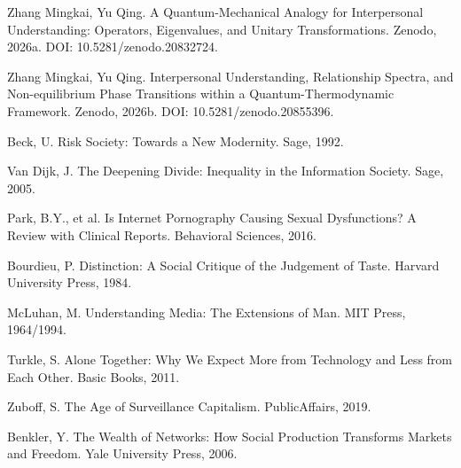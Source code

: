 ﻿\documentclass[12pt,a4paper]{article}
\begin{document}
\begin{enumerate}[label={[\arabic*]}]
\item Zhang Mingkai, Yu Qing. A Quantum-Mechanical Analogy for Interpersonal Understanding: Operators, Eigenvalues, and Unitary Transformations. Zenodo, 2026a. DOI: 10.5281/zenodo.20832724.
\item Zhang Mingkai, Yu Qing. Interpersonal Understanding, Relationship Spectra, and Non-equilibrium Phase Transitions within a Quantum-Thermodynamic Framework. Zenodo, 2026b. DOI: 10.5281/zenodo.20855396.
\item Beck, U. Risk Society: Towards a New Modernity. Sage, 1992.
\item Van Dijk, J. The Deepening Divide: Inequality in the Information Society. Sage, 2005.
\item Park, B.Y., et al. Is Internet Pornography Causing Sexual Dysfunctions? A Review with Clinical Reports. Behavioral Sciences, 2016.
\item Bourdieu, P. Distinction: A Social Critique of the Judgement of Taste. Harvard University Press, 1984.
\item McLuhan, M. Understanding Media: The Extensions of Man. MIT Press, 1964/1994.
\item Turkle, S. Alone Together: Why We Expect More from Technology and Less from Each Other. Basic Books, 2011.
\item Zuboff, S. The Age of Surveillance Capitalism. PublicAffairs, 2019.
\item Benkler, Y. The Wealth of Networks: How Social Production Transforms Markets and Freedom. Yale University Press, 2006.
\end{enumerate}
\end{document}
